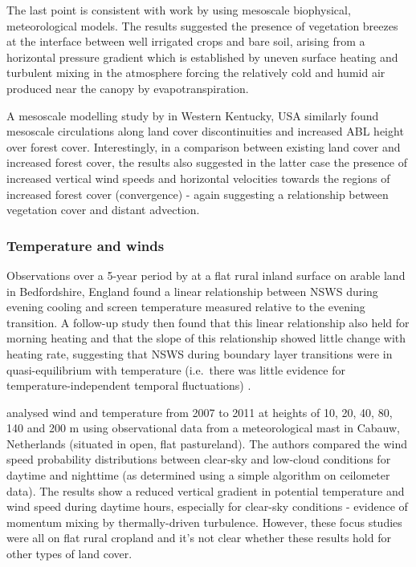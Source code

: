 The last point is consistent with work by \citet{hong1995, zhuojia1995} using mesoscale biophysical, meteorological models. The results suggested the presence of vegetation breezes at the interface between well irrigated crops and bare soil, arising from a horizontal pressure gradient which is established by uneven surface heating and turbulent mixing in the atmosphere forcing the relatively cold and humid air produced near the canopy by evapotranspiration.

A mesoscale modelling study by \citet{mahmood2011} in Western Kentucky, USA similarly found mesoscale circulations along land cover discontinuities and increased \ac{ABL} height over forest cover. Interestingly, in a comparison between existing land cover and increased forest cover, the results also suggested in the latter case the presence of increased vertical wind speeds and horizontal velocities towards the regions of increased forest cover (convergence) - again suggesting a relationship between vegetation cover and distant advection.

\subsubsection{Temperature and winds}

Observations over a 5-year period by \citet{lapworth2003} at a flat rural inland surface on arable land in Bedfordshire, England found a linear relationship between \ac{NSWS} during evening cooling and screen temperature measured relative to the evening transition. A follow-up study then found that this linear relationship also held for morning heating and that the slope of this relationship showed little change with heating rate, suggesting that \ac{NSWS} during boundary layer transitions were in quasi-equilibrium with temperature (i.e.\ there was little evidence for temperature-independent temporal fluctuations) \citep{lapworth2006}.

\citet{he2013} analysed wind and temperature from 2007 to 2011 at heights of 10, 20, 40, 80, 140 and 200 m using observational data from a meteorological mast in Cabauw, Netherlands (situated in open, flat pastureland). The authors compared the wind speed probability distributions between clear-sky and low-cloud conditions for daytime and nighttime (as determined using a simple algorithm on ceilometer data). The results show a reduced vertical gradient in potential temperature and wind speed during daytime hours, especially for clear-sky conditions - evidence of momentum mixing by thermally-driven turbulence. However, these focus studies were all on flat rural cropland and it’s not clear whether these results hold for other types of land cover.

